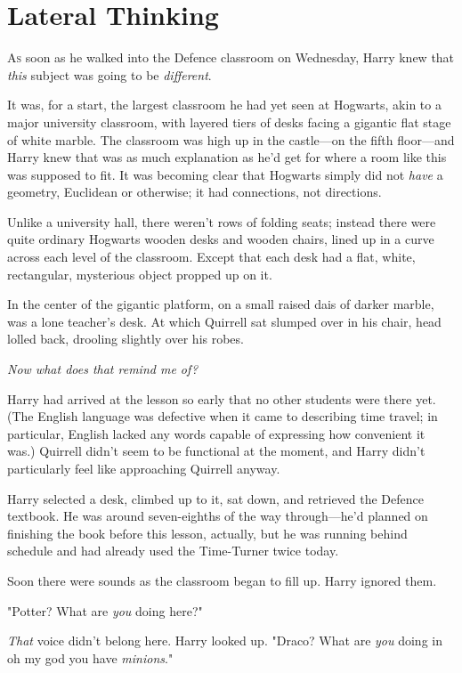 \chapter{Lateral Thinking}

\lettrine{A}{s} soon as he walked into the Defence classroom on Wednesday, Harry knew that
\emph{this} subject was going to be \emph{different}.

It was, for a start, the largest classroom he had yet seen at Hogwarts, akin to
a major university classroom, with layered tiers of desks facing a gigantic
flat stage of white marble. The classroom was high up in the castle—on the
fifth floor—and Harry knew that was as much explanation as he'd get for where
a room like this was supposed to fit. It was becoming clear that Hogwarts
simply did not \emph{have} a geometry, Euclidean or otherwise; it had
connections, not directions.

Unlike a university hall, there weren't rows of folding seats; instead there
were quite ordinary Hogwarts wooden desks and wooden chairs, lined up in a
curve across each level of the classroom. Except that each desk had a flat,
white, rectangular, mysterious object propped up on it.

In the center of the gigantic platform, on a small raised dais of darker
marble, was a lone teacher's desk. At which Quirrell sat slumped over in his
chair, head lolled back, drooling slightly over his robes.

\emph{Now what does that remind me of{\el}?}

Harry had arrived at the lesson so early that no other students were there yet.
(The English language was defective when it came to describing time travel; in
particular, English lacked any words capable of expressing how convenient it
was.) Quirrell didn't seem to be{\el} functional{\el} at the moment, and
Harry didn't particularly feel like approaching Quirrell anyway.

Harry selected a desk, climbed up to it, sat down, and retrieved the Defence
textbook. He was around seven-eighths of the way through—he'd planned on
finishing the book before this lesson, actually, but he was running behind
schedule and had already used the Time-Turner twice today.

Soon there were sounds as the classroom began to fill up. Harry ignored them.

"Potter? What are \emph{you} doing here?"

\emph{That} voice didn't belong here. Harry looked up. "Draco? What are
\emph{you} doing in oh my god you have \emph{minions}."

